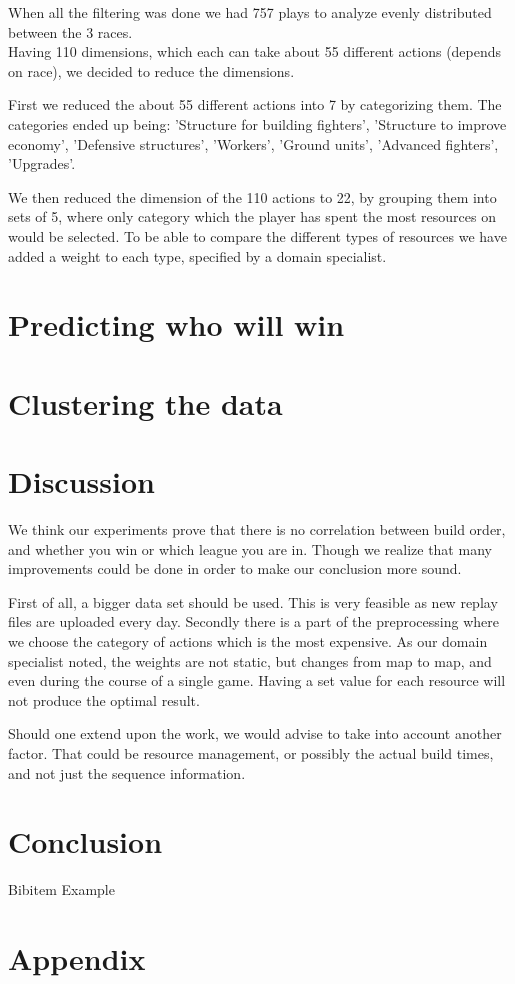 \documentclass[a4paper,11pt]{article}
\begin{document}
When all the filtering was done we had 757 plays to analyze evenly distributed between the 3 races.\\

Having 110 dimensions, which each can take about 55 different actions (depends on race), we decided to reduce the dimensions.

First we reduced the about 55 different actions into 7 by categorizing them. The categories ended up being: 'Structure for building fighters', 'Structure to improve economy', 'Defensive structures', 'Workers', 'Ground units', 'Advanced fighters', 'Upgrades'.

We then reduced the dimension of the 110 actions to 22, by grouping them into sets of 5, where only category which the player has spent the most resources on would be selected. To be able to compare the different types of resources we have added a weight to each type, specified by a domain specialist.

\section{Predicting who will win}

\section{Clustering the data}

\section{Discussion}
We think our experiments prove that there is no correlation between build order, and whether you win or which league you are in. Though we realize that many improvements could be done in order to make our conclusion more sound.

First of all, a bigger data set should be used. This is very feasible as new replay files are uploaded every day. Secondly there is a part of the preprocessing where we choose the category of actions which is the most expensive. As our domain specialist noted, the weights are not static, but changes from map to map, and even during the course of a single game. Having a set value for each resource will not produce the optimal result.

Should one extend upon the work, we would advise to take into account another factor. That could be resource management, or possibly the actual build times, and not just the sequence information.

\section{Conclusion}


\newpage

\begin{thebibliography}{}

Bibitem Example


\end{thebibliography}

\section*{Appendix}
\appendix

%
\end{document}
